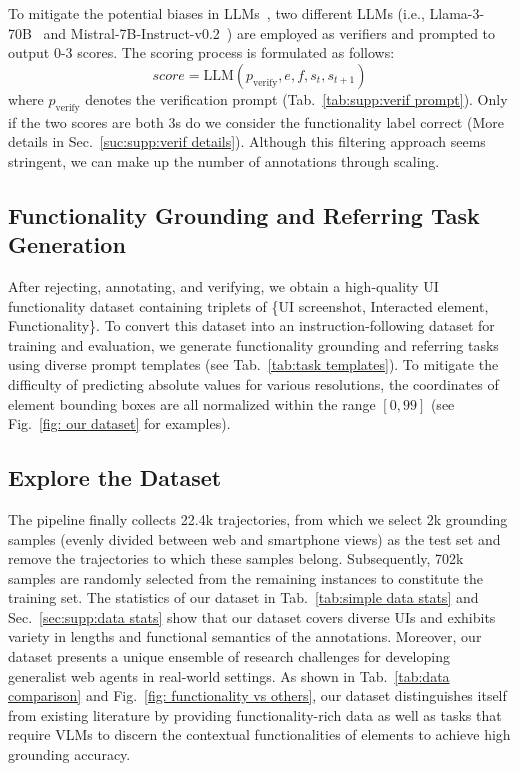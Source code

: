 To mitigate the potential biases in LLMs~\citep{panickssery2024llm, zheng2023judging, bai2024benchmarking}, two different LLMs (i.e., Llama-3-70B~\citep{llama3modelcard} and Mistral-7B-Instruct-v0.2~\citep{mistral}) are employed as verifiers and prompted to output 0-3 scores. The scoring process is formulated as follows:
\begin{equation}
 score = \text{LLM}(p_{\text{verify}}, e, f, s_t, s_{t+1})
\end{equation}
where $p_{\text{verify}}$ denotes the verification prompt (Tab.~\ref{tab:supp:verif prompt}). Only if the two scores are both 3s do we consider the functionality label correct (More details in Sec.~\ref{suc:supp:verif details}). Although this filtering approach seems stringent, we can make up the number of annotations through scaling. 



\subsection{Functionality Grounding and Referring Task Generation}
\vspace{-2mm}
After rejecting, annotating, and verifying, we obtain a high-quality UI functionality dataset containing triplets of \{UI screenshot, Interacted element, Functionality\}. To convert this dataset into an instruction-following dataset for training and evaluation, we generate functionality grounding and referring tasks using diverse prompt templates (see Tab.~\ref{tab:task templates}). To mitigate the difficulty of predicting absolute values for various resolutions, the coordinates of element bounding boxes are all normalized within the range $[0,99]$ (see Fig.~\ref{fig: our dataset} for examples).

\subsection{Explore the \methodname{} Dataset}




The \methodname{} pipeline finally collects 22.4k trajectories, from which we select 2k grounding samples (evenly divided between web and smartphone views) as the test set and remove the trajectories to which these samples belong. Subsequently, 702k samples are randomly selected from the remaining instances to constitute the training set. The statistics of our dataset in Tab.~\ref{tab:simple data stats} and Sec.~\ref{sec:supp:data stats} show that our dataset covers diverse UIs and exhibits variety in lengths and functional semantics of the annotations. Moreover, our dataset presents a unique ensemble of research challenges for developing generalist web agents in real-world settings. As shown in Tab.~\ref{tab:data comparison} and Fig.~\ref{fig: functionality vs others}, our dataset distinguishes itself from existing literature by providing functionality-rich data as well as tasks that require VLMs to discern the contextual functionalities of elements to achieve high grounding accuracy.

